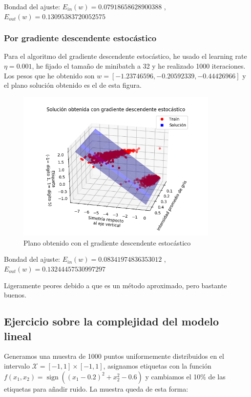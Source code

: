 \documentclass[a4]{article}
\begin{document}
\vspace{-5mm}

Bondad del ajuste: \quad
$E_{in}(w)=0.07918658628900388$ ,\qquad
$E_{out}(w)=0.13095383720052575$

\subsubsection{Por gradiente descendente estocástico}
Para el algoritmo del gradiente descendente estocástico, he usado el learning rate $\eta=0.001$, he fijado el tamaño de minibatch a 32 y he realizado 1000 iteraciones. Los pesos que he obtenido son
$w=[-1.23746596,-0.20592339, -0.44426966]$ y el plano
solución obtenido es el de esta figura. \vspace{-4mm}

\begin{figure}[H]
    \centering    
    \includegraphics[width=100mm]{imgs/digitos-sgd.png}
    \caption{Plano obtenido con el gradiente descendente estocástico}
    \label{fig:digitos-sgd}
\end{figure}

\vspace{-5mm}

Bondad del ajuste: \quad
$E_{in}(w)=0.08341974836353012$ ,\qquad
$E_{out}(w)=0.13244457530997297$

Ligeramente peores debido a que es un método aproximado, pero bastante buenos.

\subsection{Ejercicio sobre la complejidad del modelo lineal}

Generamos una muestra de 1000 puntos uniformemente distribuidos en el intervalo
$\mathcal{X}=[-1,1]\times[-1,1]$, asignamos etiquetas
con la función $f(x_1,x_2)=\operatorname{sign}((x_1-0.2)^2+x_2^2-0.6)$ y
cambiamos el 10\% de las etiquetas para añadir ruido. La muestra queda de esta forma: \vspace{-4mm}
\end{document}
